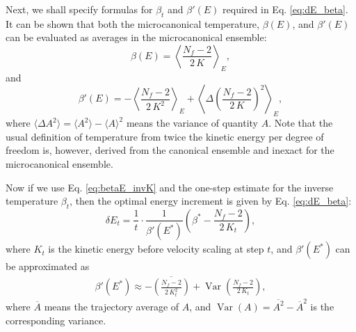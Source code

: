 \documentclass[reprint]{revtex4-1}
\begin{document}
Next, we shall specify formulas for $\beta_t$
and $\beta'(E)$ required in Eq. \eqref{eq:dE_beta}.
%
It can be shown that both the microcanonical temperature, $\beta(E)$,
and $\beta'(E)$ can be evaluated as
averages in the microcanonical ensemble\cite{rugh1997}:
%
\begin{equation}
  \beta(E)
  =
  \left\langle
    \frac{ N_f - 2 }
         { 2 \, K }
  \right\rangle_E
  ,
  \label{eq:betaE_invK}
\end{equation}
%
and
%
\begin{equation}
  \beta'(E)
  =
  - \left\langle
      \frac{ N_f - 2 }
           { 2 \, K^2 }
    \right\rangle_E
  + \left\langle
      \Delta\left(
        \frac{ N_f - 2 }
             { 2 \, K }
      \right)^2
    \right\rangle_E
  ,
  \label{eq:dbetadE}
\end{equation}
%
where
$\langle \Delta A^2 \rangle = \langle A^2 \rangle - \langle A \rangle^2$
means the variance of quantity $A$.
%
Note that the usual definition of temperature from twice the kinetic energy
per degree of freedom is, however,
derived from the canonical ensemble and
inexact for the microcanonical ensemble.



Now if we use Eq. \eqref{eq:betaE_invK} and
the one-step estimate for the inverse temperature
$\beta_t$,
then the optimal energy increment is given by
Eq. \eqref{eq:dE_beta}:
\begin{equation}
\delta E_t
=
\frac{ 1 } { t } \cdot
\frac{ 1 } { \beta'(E^*) }
\left(
 \beta^* -
 \frac{ N_f - 2 }
 { 2 \, K_t }
\right)
,
\label{eq:dE_final}
\end{equation}
where
$K_t$ is the kinetic energy before velocity scaling at step $t$,
and $\beta'(E^*)$ can be approximated
as
%
\begin{align}
  \beta'(E^*)
  \approx
  - \overline{
    \left(
      \frac{ N_f - 2 }
           { 2 \, K_t^2 }
    \right)
    }
    +
    \operatorname{Var}
    \left(
        \frac{ N_f - 2 }
             { 2 \, K_t }
    \right)
  ,
  \label{eq:dbeta}
\end{align}
%
where
$\overline A$ means the trajectory average of $A$,
and
$\operatorname{Var}(A) = \overline{ A^2 } - {\overline A}^2$
is the corresponding variance.
%
\end{document}
